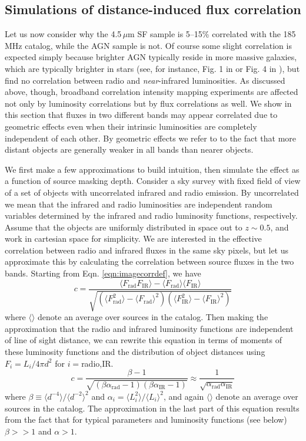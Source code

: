 \documentclass[numberedappendix]{emulateapj}
\newcommand{\rad}{\text{rad}}
\newcommand{\ir}{\text{IR}}
\begin{document}
\subsection{Simulations of distance-induced flux correlation}
\label{sec:fluxcorsims}
Let us now consider why the 4.5\,$\mu$m SF sample is 5--15\% correlated with the 185\,MHz catalog, while the AGN sample is not. Of course some slight correlation is expected simply because brighter AGN typically reside in more massive galaxies, which are typically brighter in stars (see, for instance, Fig. 1 in \citep{seymour07} or Fig. 4 in \citep{Willott03}), but \citet{mauch07} find no correlation between radio and \textit{near}-infrared luminosities. As discussed above, though, broadband correlation intensity mapping experiments are affected not only by luminosity correlations but by flux correlations as well. We show in this section that fluxes in two different bands may appear correlated due to geometric effects even when their intrinsic luminosities are completely independent of each other. By geometric effects we refer to to the fact that more distant objects are generally weaker in all bands than nearer objects. 

We first make a few approximations to build intuition, then simulate the effect as a function of source masking depth. Consider a sky survey with fixed field of view of a set of objects with uncorrelated infrared and radio emission. By uncorrelated we mean that the infrared and radio luminosities are independent random variables determined by the infrared and radio luminosity functions, respectively. Assume that the objects are uniformly distributed in space out to $z\sim0.5$, and work in cartesian space for simplicity. We are interested in the effective correlation between radio and infrared fluxes in the same sky pixels, but let us approximate this by calculating the correlation between source fluxes in the two bands. Starting from Eqn. \ref{eqn:imagecorrdef}, we have
\begin{equation} %
	c = \frac{\langle F_\rad F_\ir \rangle-\langle F_\rad\rangle\langle F_\ir\rangle}{\sqrt{(\langle F_\rad^2\rangle-\langle F_\rad\rangle^2)(\langle F_\ir^2\rangle-\langle F_\ir\rangle^2)}}
\end{equation}
where $\langle\rangle$ denote an average over sources in the catalog. Then making the approximation that the radio and infrared luminosity functions are independent of line of sight distance, we can rewrite this equation in terms of moments of these luminosity functions and the distribution of object distances using $F_i=L_i/4\pi d^2$ for $i=$radio,IR.
\begin{equation}
\label{eqn:cresult}
	c = \frac{\beta-1}{\sqrt{(\beta\alpha_\rad-1)(\beta\alpha_\ir-1)}}\approx\frac{1}{\sqrt{\alpha_\rad \alpha_\ir}}
\end{equation}
where $\beta\equiv\langle d^{-4}\rangle/\langle d^{-2}\rangle^2$ and $\alpha_i=\langle L_i^2\rangle/\langle L_i\rangle^2$, and again $\langle\rangle$ denote an average over sources in the catalog. The approximation in the last part of this equation results from the fact that for typical parameters and luminosity functions (see below) $\beta>>1$ and $\alpha>1$. 
\end{document}
